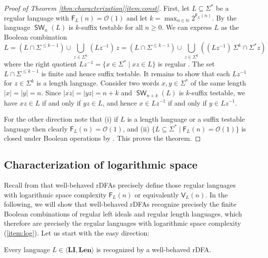 \documentclass{theoretics}
\newcommand{\N}{\mathbb{N}}
\renewcommand{\O}{\mathcal{O}}
\newcommand{\F}{\mathsf{F}}
\newcommand{\V}{\mathsf{V}}
\DeclareMathOperator{\SW}{\mathsf{SW}}
\newcommand{\Len}{\mathbf{Len}}
\newcommand{\LI}{\mathbf{LI}}
\renewcommand{\geq}{\geqslant}
\renewcommand{\leq}{\leqslant}
\renewcommand{\ge}{\geq}
\renewcommand{\le}{\leq}
\begin{document}
\begin{proof}[Proof of Theorem \ref{thm:characterization}\ref{item:const}]
	First, let $L \subseteq \Sigma^*$ be a regular language with $\F_L(n) = \O(1)$
	and let $k = \max_{n \in \N} 2^{\F_L(n)}$.
	By  the language $\SW_n(L)$ is $k$-suffix testable for all $n \ge 0$.
	We can express $L$ as the Boolean combination
	\[
		L = (L \cap \Sigma^{\le k-1}) \cup \bigcup_{z \in \Sigma^k} (Lz^{-1}) \, z = (L \cap \Sigma^{\le k-1}) \cup \bigcup_{z \in \Sigma^k} ((Lz^{-1}) \, \Sigma^k \cap \Sigma^* z)
	\]
	where the right quotient $Lz^{-1} = \{ x \in \Sigma^* \mid xz \in L \}$ is regular \cite[Chapter~3,~Example~5.7]{Berstel79}.
	The set $L \cap \Sigma^{\le k-1}$ is finite and hence suffix testable. 
	It remains to show that each $Lz^{-1}$ for $z \in \Sigma^k$  is a length language.
	Consider two words $x,y \in \Sigma^*$ of the same length $|x|=|y|=n$.
	Since $|xz|=|yz| = n+k$ and $\SW_{n+k}(L)$ is $k$-suffix testable, we have $xz \in L$ if and only if $yz \in L$,
	and hence $x \in Lz^{-1}$ if and only if $y \in Lz^{-1}$.
			
	For the other direction note that
	(i) if $L$ is a length language or a suffix testable language then clearly
	$\F_L(n) = \O(1)$, and
	(ii) $\{ L \subseteq \Sigma^* \mid \F_L(n) = \O(1) \}$ is closed under Boolean operations by .
	This proves the theorem.
\end{proof}

\subsection{Characterization of logarithmic space}

\label{sec:char-log}

Recall from  that well-behaved \mbox{rDFAs} precisely define those regular languages
with logarithmic space complexity $\F_L(n)$ or equivalently $\V_L(n)$.
In the following, we will show that
well-behaved rDFAs recognize precisely the finite Boolean combinations of
regular left ideals and regular length languages,
which therefore are precisely the regular languages with logarithmic space complexity (\ref{item:log}).
Let us start with the easy direction:

\begin{proposition}
	Every language $L \in \langle \LI, \Len \rangle$ is recognized by a well-behaved rDFA.
\end{proposition}
\end{document}
